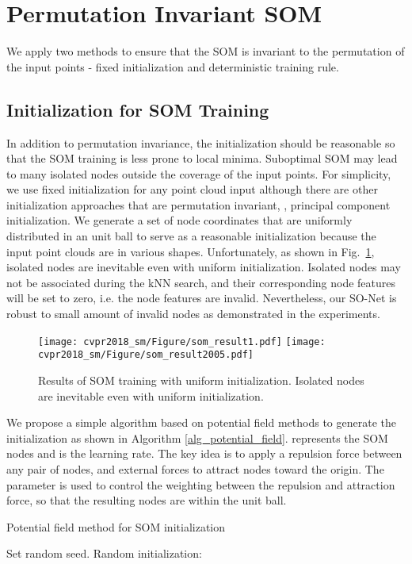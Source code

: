 \documentclass[10pt,twocolumn,letterpaper]{article}
\begin{document}
\section{Permutation Invariant SOM} \label{sec_supplementary_som}
We apply two methods to ensure that the SOM is invariant to the permutation of the input points - fixed initialization and deterministic training rule.

\subsection{Initialization for SOM Training}
In addition to permutation invariance, the initialization should be reasonable so that the SOM training is less prone to local minima. Suboptimal SOM may lead to many isolated nodes outside the coverage of the input points. 
For simplicity, we use fixed initialization for any point cloud input
although there are other initialization approaches that are permutation invariant, \eg, principal component initialization. We generate a set of node coordinates that are uniformly distributed in an unit ball to serve as a reasonable initialization because the input point clouds are in various shapes. Unfortunately,
as shown in Fig.~\ref{fig_som_results},
isolated nodes are inevitable even with uniform initialization. 
Isolated nodes may not be associated during the kNN search, and their corresponding node features will be set to zero, i.e. the node features are invalid. Nevertheless, our SO-Net is robust to small amount of invalid nodes as demonstrated in the experiments.

\begin{figure}[t]
        \centering
        \texttt{[image: cvpr2018\_sm/Figure/som\_result1.pdf]}
        \texttt{[image: cvpr2018\_sm/Figure/som\_result2005.pdf]}
        \caption{ Results of SOM training with uniform initialization. Isolated nodes are inevitable even with uniform initialization.} \label{fig_som_results}
        \vspace{-4pt}
\end{figure}

We propose a simple algorithm based on potential field methods to generate the initialization as shown in Algorithm \ref{alg_potential_field}.  represents the SOM nodes and  is the learning rate. The key idea is to apply a repulsion force between any pair of nodes, and external forces to attract nodes toward the origin. The parameter  is used to control the weighting between the repulsion and attraction force, so that the resulting nodes are within the unit ball.
\begin{algorithm}
\caption{Potential field method for SOM initialization} \label{alg_potential_field}
\begin{algorithmic}
\State Set random seed.
\State Random initialization: 
\Repeat
\ForAll{}
    \State 
    \State 
    \ForAll{}
        \State 
    \EndFor
\EndFor
\ForAll{}
    \State 
\EndFor
{}
\end{algorithmic}
\end{algorithm}
\end{document}
